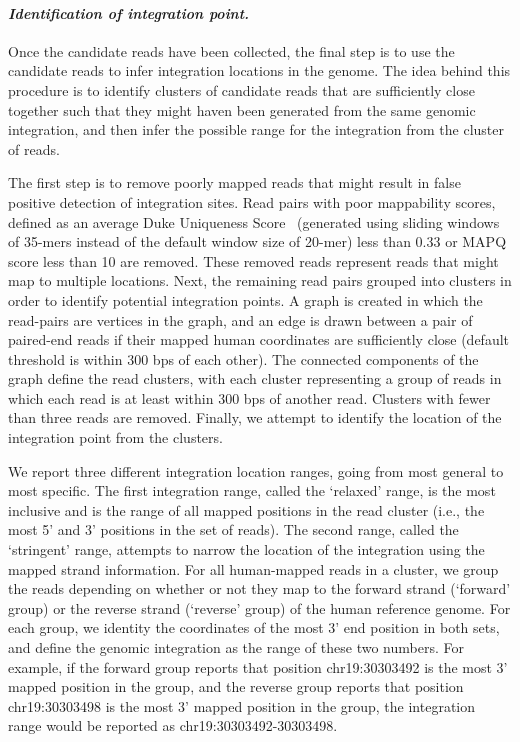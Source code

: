 \documentclass[a4,center,fleqn]{NAR}
\begin{document}
\paragraph{\emph{Identification of integration point.}}  Once the candidate reads have been collected, the final step is to use the candidate reads to infer integration locations in the genome.  The idea behind this procedure is to identify clusters of candidate reads that are sufficiently close together such that they might haven been generated from the same genomic integration, and then infer the possible range for the integration from the cluster of reads.  

The first step is to remove poorly mapped reads that might result in false positive detection of integration sites.  Read pairs with poor mappability scores, defined as an average Duke Uniqueness Score~\cite{Rosenbloom2013} (generated using sliding windows of 35-mers instead of the default window size of 20-mer) less than 0.33 or MAPQ score less than 10 are removed.  These removed reads represent reads that might map to multiple locations.  Next, the remaining read pairs grouped into clusters in order to identify potential integration points.  A graph is created in which the read-pairs are vertices in the graph, and an edge is drawn between a pair of paired-end reads if their mapped human coordinates are sufficiently close (default threshold is within 300 bps of each other).  The connected components of the graph define the read clusters, with each cluster representing a group of reads in which each read is at least within 300 bps of another read.  Clusters with fewer than three reads are removed.  Finally, we attempt to identify the location of the integration point from the clusters.  

We report three different integration location ranges, going from most general to most specific.  The first integration range, called the `relaxed' range, is the most inclusive and is the range of all mapped positions in the read cluster (i.e., the most 5' and 3' positions in the set of reads).  The second range, called the `stringent' range, attempts to narrow the location of the integration using the mapped strand information.  For all human-mapped reads in a cluster, we group the reads depending on whether or not they map to the forward strand (`forward' group) or the reverse strand (`reverse' group) of the human reference genome.  For each group, we identity the coordinates of the most 3' end position in both sets, and define the genomic integration as the range of these two numbers.  For example, if the forward group reports that position chr19:30303492 is the most 3' mapped position in the group, and the reverse group reports that position chr19:30303498 is the most 3' mapped position in the group, the integration range would be reported as chr19:30303492-30303498.
\end{document}

